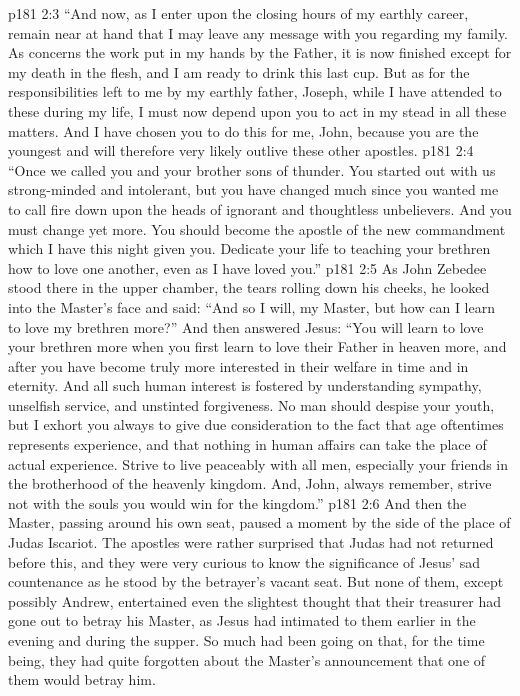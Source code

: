 \vs p181 2:3 \textcolor{ubdarkred}{“And now, as I enter upon the closing hours of my earthly career, remain near at hand that I may leave any message with you regarding my family. As concerns the work put in my hands by the Father, it is now finished except for my death in the flesh, and I am ready to drink this last cup. But as for the responsibilities left to me by my earthly father, Joseph, while I have attended to these during my life, I must now depend upon you to act in my stead in all these matters. And I have chosen you to do this for me, John, because you are the youngest and will therefore very likely outlive these other apostles.}
\vs p181 2:4 \textcolor{ubdarkred}{“Once we called you and your brother sons of thunder. You started out with us strong\hyp{}minded and intolerant, but you have changed much since you wanted me to call fire down upon the heads of ignorant and thoughtless unbelievers. And you must change yet more. You should become the apostle of the new commandment which I have this night given you. Dedicate your life to teaching your brethren how to love one another, even as I have loved you.”}
\vs p181 2:5 As John Zebedee stood there in the upper chamber, the tears rolling down his cheeks, he looked into the Master’s face and said: “And so I will, my Master, but how can I learn to love my brethren more?” And then answered Jesus: \textcolor{ubdarkred}{“You will learn to love your brethren more when you first learn to love their Father in heaven more, and after you have become truly more interested in their welfare in time and in eternity. And all such human interest is fostered by understanding sympathy, unselfish service, and unstinted forgiveness. No man should despise your youth, but I exhort you always to give due consideration to the fact that age oftentimes represents experience, and that nothing in human affairs can take the place of actual experience. Strive to live peaceably with all men, especially your friends in the brotherhood of the heavenly kingdom. And, John, always remember, strive not with the souls you would win for the kingdom.”}
\pc \vs p181 2:6 And then the Master, passing around his own seat, paused a moment by the side of the place of Judas Iscariot. The apostles were rather surprised that Judas had not returned before this, and they were very curious to know the significance of Jesus’ sad countenance as he stood by the betrayer’s vacant seat. But none of them, except possibly Andrew, entertained even the slightest thought that their treasurer had gone out to betray his Master, as Jesus had intimated to them earlier in the evening and during the supper. So much had been going on that, for the time being, they had quite forgotten about the Master’s announcement that one of them would betray him.
